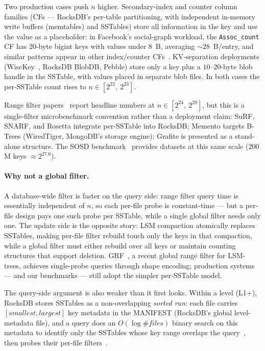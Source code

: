 Two production cases push $n$ higher. Secondary-index and counter
column families (CFs --- RocksDB's per-table partitioning, with
independent in-memory write buffers (memtables) and SSTables) store all information in the
key and use the value as a placeholder: in Facebook's social-graph
workload, the \texttt{Assoc\_count} CF has $20$-byte bigint
keys with values
under $8$~B, averaging $\sim 28$~B/entry, and similar patterns
appear in other index/counter CFs~\citep{cao2020facebook}.
KV-separation deployments
(WiscKey~\citep{wisckey2016}, RocksDB BlobDB, Pebble) store only a key
plus a $10$--$20$-byte blob handle in the SSTable, with values placed
in separate blob files. In both cases the per-SSTable count rises
to $n \in [2^{22},\ 2^{23}]$.

Range filter
papers~\citep{zhang2018surf,luo2020rosetta,vaidya2022snarf,eslami2024memento,grafite2024}
report headline numbers at $n \in [2^{24},\ 2^{28}]$, but this is a
single-filter microbenchmark convention rather than a deployment
claim: SuRF, SNARF, and Rosetta integrate per-SSTable into RocksDB;
Memento targets B-Trees (WiredTiger, MongoDB's storage engine); Grafite is presented as a
stand-alone structure. The SOSD benchmark~\citep{kipf2019sosd}
provides datasets at this same scale ($200$M keys $\approx 2^{27.6}$).

\paragraph{Why not a global filter.}
A database-wide filter is faster on the query side: range filter query
time is essentially independent of $n$, so each per-file probe is
constant-time --- but a per-file design pays one such probe per
SSTable, while a single global filter needs only one. The update
side is the opposite story: LSM compaction atomically replaces SSTables,
making per-file filter rebuild touch only the keys in that compaction,
while a global filter must either rebuild over all keys or maintain
counting structures that support deletion.
GRF~\citep{wang2024grf}, a recent global range filter for LSM-trees,
achieves single-probe queries through shape encoding; production
systems --- and our benchmarks --- still adopt the simpler per-SSTable
model.

The query-side argument is also weaker than it first looks. Within a
level (L1+), RocksDB stores SSTables as a non-overlapping
\emph{sorted run}: each file carries $[\textit{smallest},
\textit{largest}]$ key metadata in the MANIFEST (RocksDB's global level-metadata file), and a query does an
$O(\log\#\textit{files})$ binary search on this metadata to identify
only the SSTables whose key range overlaps the query~\citep{rocksdb-leveled},
then probes their per-file filters~\citep{rocksdb-bloom}.

